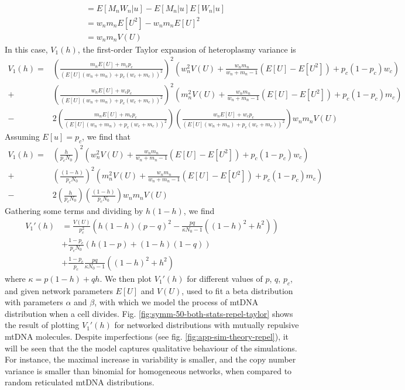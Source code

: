 \documentclass{article}
\begin{document}
\begin{appendices}
\begin{equation*}
\begin{split}
        & = E[M_nW_n|u]-E[M_n|u]E[W_n|u]\\
        & = w_nm_nE[U^2]-w_nm_nE[U]^2\\
        & = w_nm_nV(U)
    \end{split}
\end{equation*}
In this case, $V_1(h)$, the first-order Taylor expansion of heteroplasmy variance is
\begin{equation}
    \begin{split}
      V_1(h)= &\left(\frac{m_nE[U]+m_cp_c}{(E[U](w_n+m_n)+p_c(w_c+m_c))^2}\right)^2
       \left(w_n^2V(U)+\frac{w_nm_n}{w_n+m_n-1}(E[U]-E[U^2])+p_c(1-p_c)w_c\right)\\
      +&\left(\frac{w_nE[U]+w_cp_c}{(E[U](w_n+m_n)+p_c(w_c+m_c))^2}\right)^2
       (m_n^2V(U)+\frac{w_nm_n}{w_n+m_n-1}(E[U]-E[U^2])+p_c(1-p_c)m_c)\\
      -&2\left(\frac{m_nE[U]+m_cp_c}{(E[U](w_n+m_n)+p_c(w_c+m_c))^2}\right)\left(\frac{w_nE[U]+w_cp_c}{(E[U](w_n+m_n)+p_c(w_c+m_c))^2}\right)w_nm_nV(U)
    \end{split}
\end{equation}
Assuming $E[u]=p_c$, we find that
\begin{equation}
    \begin{split}
      V_1(h)= &\left(\frac{h}{p_cN_0}\right)^2
       \left(w_n^2V(U)+\frac{w_nm_n}{w_n+m_n-1}(E[U]-E[U^2])+p_c(1-p_c)w_c\right)\\
      +&\left(\frac{(1-h)}{p_cN_0}\right)^2
       (m_n^2V(U)+\frac{w_nm_n}{w_n+m_n-1}(E[U]-E[U^2])+p_c(1-p_c)m_c)\\
      -&2\left(\frac{h}{p_cN_0}\right)\left(\frac{(1-h)}{p_cN_0}\right)w_nm_nV(U)
    \end{split}
\end{equation}
Gathering some terms and dividing by $h(1-h)$, we find
\begin{equation}\label{eq:v1h-net-repel}
    \begin{split}
      V_1'(h) & = \frac{V(U)}{p_c^2}\left(h(1-h)(p-q)^2-\frac{pq}{\kappa N_0-1}((1-h)^2+h^2)\right)\\
      & + \frac{1-p_c}{p_c N_0}\left(h(1-p)+(1-h)(1-q)\right)\\
      & + \frac{1-p_c}{p_c}\frac{pq}{\kappa N_0-1}\left((1-h)^2+h^2\right)
    \end{split}
\end{equation}
where $\kappa = p(1-h)+qh$.
We then plot $V_1'(h)$ for different values of $p$, $q$, $p_c$, and given network parameters $E[U]$ and $V(U)$, used to fit a beta distribution with parameters $\alpha$ and $\beta$, with which we model the process of mtDNA distribution when a cell divides. Fig. \ref{fig:symm-50-both-stats-repel-taylor} shows the result of plotting $V_1'(h)$ for networked distributions with mutually repulsive mtDNA molecules. Despite imperfections (see fig. \ref{fig:app-sim-theory-repel}), it will be seen that the the model captures qualitative behaviour of the simulations. For instance, the maximal increase in variability is smaller, and the copy number variance is smaller than binomial for homogeneous networks, when compared to random reticulated mtDNA distributions.


\end{appendices}
\end{document}
